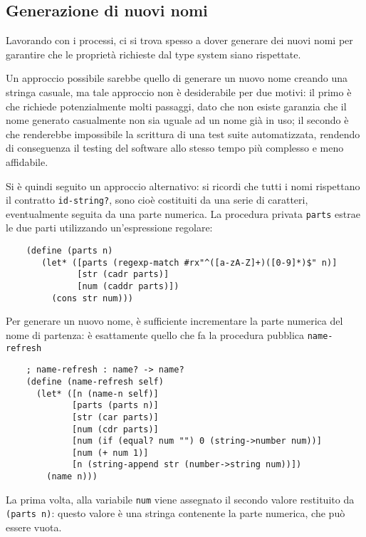 \subsection{Generazione di nuovi nomi}

Lavorando con i processi, ci si trova spesso a dover generare dei
nuovi nomi per garantire che le propriet\`a richieste dal type system
siano rispettate.

Un approccio possibile sarebbe quello di generare un nuovo nome creando
una stringa casuale, ma tale approccio non \`e desiderabile per due
motivi: il primo \`e che richiede potenzialmente molti passaggi, dato
che non esiste garanzia che il nome generato casualmente non sia uguale
ad un nome gi\`a in uso; il secondo \`e che renderebbe impossibile la
scrittura di una test suite automatizzata, rendendo di conseguenza il
testing del software allo stesso tempo pi\`u complesso e meno affidabile.

Si \`e quindi seguito un approccio alternativo: si ricordi che tutti i
nomi rispettano il contratto \lstinline{id-string?}, sono cio\`e
costituiti da una serie di caratteri, eventualmente seguita da una parte
numerica. La procedura privata \lstinline{parts} estrae le due parti
utilizzando un'espressione regolare:

\begin{lstlisting}
    (define (parts n)
       (let* ([parts (regexp-match #rx"^([a-zA-Z]+)([0-9]*)$" n)]
              [str (cadr parts)]
              [num (caddr parts)])
         (cons str num)))
\end{lstlisting}

Per generare un nuovo nome, \`e sufficiente incrementare la parte numerica
del nome di partenza: \`e esattamente quello che fa la procedura pubblica
\lstinline{name-refresh}

\begin{lstlisting}
    ; name-refresh : name? -> name?
    (define (name-refresh self)
      (let* ([n (name-n self)]
             [parts (parts n)]
             [str (car parts)]
             [num (cdr parts)]
             [num (if (equal? num "") 0 (string->number num))]
             [num (+ num 1)]
             [n (string-append str (number->string num))])
        (name n)))
\end{lstlisting}

La prima volta, alla variabile \lstinline{num} viene assegnato il secondo
valore restituito da \lstinline{(parts n)}: questo valore \`e una stringa
contenente la parte numerica, che pu\`o essere vuota.

